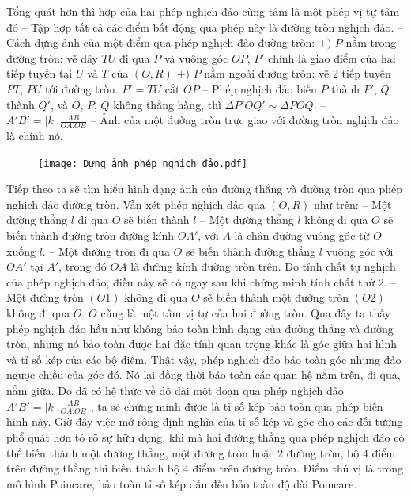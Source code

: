 \begin{multicols}{2}
	Tổng quát hơn thì hợp của hai phép nghịch đảo cùng tâm là một phép vị tự tâm đó 
	\vskip 0.1cm
	-- Tập hợp tất cả các điểm bất động qua phép này là đường tròn nghịch đảo.
	\vskip 0.1cm
	-- Cách dựng ảnh của một điểm qua phép nghịch đảo đường tròn:
	\vskip 0.1cm
	$+)$ $P$ nằm trong đường tròn: vẽ dây $TU$ đi qua $P$ và vuông góc $OP$, $P'$ chính là giao điểm của hai tiếp tuyến tại $U$ và $T$ của $(O, R)$
	\vskip 0.1cm
	$+)$ $P$ nằm ngoài đường tròn: vẽ $2$ tiếp tuyến $PT$, $PU$ tới đường tròn. $P' = TU$ cắt $OP$
	\vskip 0.1cm
	-- Phép nghịch đảo biến $P$ thành $P'$, $Q$ thành $Q'$, và $O$, $P$, $Q$ không thẳng hàng, thì $\Delta  P'OQ' \sim  \Delta POQ$.
	\vskip 0.1cm
	-- $A'B' = |k|. \frac{AB}{OA.OB}$
	\vskip 0.1cm
	-- Ảnh của một đường tròn trực giao với đường tròn nghịch đảo là chính nó.
	\begin{figure}[H]
		\vspace*{-5pt}
		\centering
		\captionsetup{labelformat= empty, justification=centering}
		\texttt{[image: Dựng ảnh phép nghịch đảo.pdf]}
		\vspace*{-10pt}
	\end{figure}
	Tiếp theo ta sẽ tìm hiểu hình dạng ảnh của đường thẳng và đường tròn qua phép nghịch đảo đường tròn. Vẫn xét phép nghịch đảo qua $(O, R)$ như trên: 
	\vskip 0.1cm
	-- Một đường thẳng $l$ đi qua $O$ sẽ biến thành $l$
	\vskip 0.1cm
	-- Một đường thẳng $l$ không đi qua $O$ sẽ biến thành  đường tròn đường kính $OA'$, với $A$ là chân đường vuông góc từ $O$ xuống $l$.
	\vskip 0.1cm 
	-- Một đường tròn đi qua $O$ sẽ biến thành đường thẳng $l$ vuông góc với $OA'$ tại $A'$, trong đó $OA$ là đường kính đường tròn trên. Do tính chất tự nghịch của phép nghịch đảo, điều này sẽ có ngay sau khi chứng minh tính chất thứ $2$. 
	\vskip 0.1cm
	-- Một đường tròn $(O1)$ không đi qua $O$ sẽ biến thành một đường tròn $(O2)$ không đi qua $O$. $O$ cũng là một tâm vị tự của hai đường tròn. 
	\vskip 0.1cm
	Qua đây ta thấy phép nghịch đảo hầu như không bảo toàn hình dạng của đường thẳng và đường tròn, nhưng nó bảo toàn được hai đặc tính quan trọng khác là góc giữa hai hình và tỉ số kép của các bộ điểm. Thật vậy, phép nghịch đảo bảo toàn góc nhưng đảo ngược chiều của góc đó. Nó lại đồng thời bảo toàn các quan hệ nằm trên, đi qua, nằm giữa. Do đã có hệ thức về độ dài một đoạn qua phép nghịch đảo  $A'B' = |k|. \frac{AB}{OA.OB}$ , ta sẽ chứng minh được là tỉ số kép bảo toàn qua phép biến hình này. Giờ đây việc mở rộng định nghĩa của tỉ số kép và góc cho các đối tượng phổ quát hơn tỏ rõ sự hữu dụng, khi mà hai đường thẳng qua phép nghịch đảo có thể biến thành một đường thẳng, một đường tròn hoặc $2$ đường tròn, bộ $4$ điểm trên đường thẳng thì biến thành bộ $4$ điểm trên đường tròn. Điểm thú vị là trong mô hình Poincare, bảo toàn tỉ số kép dẫn đến bảo toàn độ dài Poincare.

\end{multicols}

